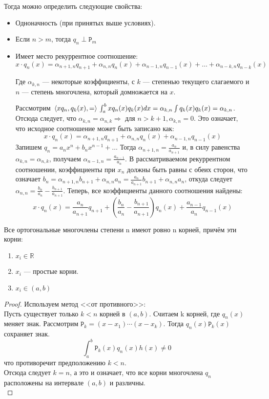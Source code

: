\documentclass[12pt]{article}
\begin{document}
	Тогда можно определить следующие свойства:
	\begin{itemize}
		\item Одноначность (при принятых выше условиях).
		\item Если $n > m$, тогда $q_n \perp \mathtt{P}_m$
		\item Имеет место рекуррентное соотношение: \\
		$$ x \cdot q_n(x) = 
		\alpha_{n+1,n} q_{n+1} + \alpha_{n,n} q_n(x) + \alpha_{n-1, n} q_{n-1} (x) + \ldots + \alpha_{n-k, n} q_{n-k} (x) $$
		
		Где $\alpha_{k, n}$ --- некоторые коэффициенты, с $k$ --- степенью текущего слагаемого и $n$ --- степень многочлена, который 
		домножается	на $x$.
		
		Рассмотрим $\, \langle x q_n, q_k(x), = \rangle \, \int_a^b x q_n(x) q_k(x) dx = \alpha_{k,n} \int q_k(x) q_k(x) = \alpha_{k,n}$.
		Отсюда следует, что $\alpha_{k,n} = \alpha_{n,k} \Rightarrow$ для $n > k+1,\alpha_{k,n} = 0$. Это означает, что исходное соотношение
		может быть записано как:
		$$ x \cdot q_n(x) = 
		\alpha_{n+1,n} q_{n+1} + \alpha_{n,n} q_n(x) + \alpha_{n-1, n} q_{n-1} (x)$$
		Запишем $q_n = a_n x^n + b_n x^{n-1} + \ldots$
		Тогда $\alpha_{n+1, n} = \frac{a_n}{a_{n+1}}$ и, в силу равенства $\alpha_{k,n} = \alpha_{n,k}$, получаем $\alpha_{n-1, n} 
		= \frac{a_{n-1}}{a_n}$. В рассматриваемом рекуррентном соотношении, коэффициенты при $x_n$ должны быть равны с обеих
		сторон, что означает $b_n = \alpha_{n+1, n} b_{n+1} + \alpha_{n,n} a_n = \frac{a_n}{a_{n+1}} b_{n+1} + \alpha_{n,n} a_n$, 
		откуда следует $\alpha_{n,n} = \frac{b_n}{a_n} - \frac{b_{n+1}}{a_{n+1}}$. Теперь, все коэффициенты данного соотношения
		найдены:
		$$ x \cdot q_n(x) = 
		\frac{a_n}{a_{n+1}} q_{n+1} + (\frac{b_n}{a_n} - \frac{b_{n+1}}{a_{n+1}}) q_n(x) + \frac{a_{n-1}}{a_n} q_{n-1} (x)$$
	\end{itemize}
	
	\begin{state}
		Все ортогональные многочлены степени n имеют ровно n корней, причём эти корни:
		\begin{enumerate}
			\item $x_i \in \mathbb{R}$
			\item $x_i$ --- простые корни.
			\item $x_i \in (a,b)$
		\end{enumerate}
		\begin{proof}
			Используем метод <<от противного>>: \\
			Пусть существует только $k < n$ корней в $(a,b)$. Считаем k корней, где $q_n(x)$ меняет знак. Рассмотрим 
			$\mathtt{P}_k = (x - x_1) \cdots (x - x_k)$. Тогда $q_n(x) \mathtt{P}_k(x)$ сохраняет знак. 
			$$ \int_a^b \mathtt{P}_k (x) q_n(x) h(x) \neq 0$$
			что противоречит предположению $k < n$. \\
			Отсюда следует $k = n$, а это и означает, что все корни многочлена $q_n$ расположены на интервале $(a,b)$ 
			и различны.\\
		\end{proof}
	\end{state}
\end{document}

